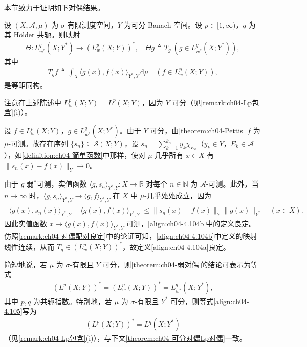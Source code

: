 \documentclass[../../main.tex]{subfiles}%
\begin{document}
本节致力于证明如下对偶结果。

\begin{theorem}\label{theorem:ch04-弱对偶}
设 $(X,\mathcal{A},\mu)$ 为 $\sigma$-有限测度空间，$Y$ 为可分 Banach 空间。设 $p\in[1,\infty)$，$q$ 为其 Hölder 共轭。则映射
\begin{align}
\Theta:L^q_{w^*}(X;Y^*)\to(L^p_w(X;Y))^*,\quad \Theta g\triangleq T_g\ (g\in L^q_{w^*}(X;Y^*)), \label{align:ch04-4.104a}
\end{align}
其中
\begin{align}
T_gf\triangleq \int_X\langle g(x),f(x)\rangle_{Y^*,Y}\,\mathrm{d}\mu\quad(f\in L^p_w(X;Y)), \label{align:ch04-4.104b}
\end{align}
是等距同构。
\end{theorem}

注意在上述陈述中 $L^p_w(X;Y)=L^p(X;Y)$，因为 $Y$ 可分（见\cref{remark:ch04-Lp包含}(i)）。

\begin{remark}\label{remark:ch04-弱对偶良定}
设 $f\in L^p_w(X;Y)$，$g\in L^q_{w^*}(X;Y^*)$。由于 $Y$ 可分，由\cref{theorem:ch04-Pettis} $f$ 为 $\mu$-可测。故存在序列 $\{s_n\}\subseteq\mathcal{S}(X;Y)$，设 $s_n=\sum_{k=1}^{k_n}y_k\chi_{E_k}$（$y_k\in Y$，$E_k\in\mathcal{A}$），如\cref{definition:ch04-简单函数}中那样，使对 $\mu$-几乎所有 $x\in X$ 有 $\|s_n(x)-f(x)\|_Y\to0$。

由于 $g$ 弱$^*$可测，实值函数 $\langle g,s_n\rangle_{Y^*,Y}:X\to\mathbb{R}$ 对每个 $n\in\mathbb{N}$ 为 $\mathcal{A}$-可测。此外，当 $n\to\infty$ 时，$\langle g,s_n\rangle_{Y^*,Y}\to\langle g,f\rangle_{Y^*,Y}$ 在 $X$ 中 $\mu$-几乎处处成立，因为
\begin{align*}
|\langle g(x),s_n(x)\rangle_{Y^*,Y}-\langle g(x),f(x)\rangle_{Y^*,Y}|\leqslant\|s_n(x)-f(x)\|_Y\|g(x)\|_{Y^*}\quad(x\in X).
\end{align*}
因此实值函数 $x\mapsto\langle g(x),f(x)\rangle_{Y^*,Y}$ 可测，\eqref{align:ch04-4.104b}中的定义良定。仿照\cref{remark:ch04-对偶配对良定}中的论证可知，\eqref{align:ch04-4.104b}中定义的映射线性连续，从而 $T_g\in(L^p_w(X;Y))^*$，故定义\eqref{align:ch04-4.104a}良定。

简短地说，若 $\mu$ 为 $\sigma$-有限且 $Y$ 可分，则\cref{theorem:ch04-弱对偶}的结论可表示为等式
\begin{align}
(L^p(X;Y))^*=(L^p_w(X;Y))^*=L^q_{w^*}(X;Y^*), \label{align:ch04-4.105}
\end{align}
其中 $p,q$ 为共轭指数。特别地，若 $\mu$ 为 $\sigma$-有限且 $Y^*$ 可分，则等式\eqref{align:ch04-4.105}写为
\begin{align}
(L^p(X;Y))^*=L^q(X;Y^*) \label{align:ch04-4.106}
\end{align}
（见\cref{remark:ch04-Lp包含}(i)），与下文\cref{theorem:ch04-可分对偶Lp对偶}一致。
\end{remark}
\end{document}
